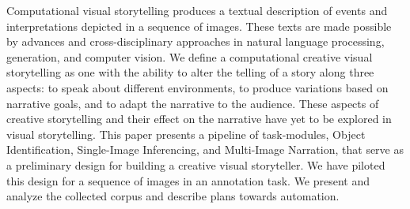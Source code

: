 Computational visual storytelling produces a textual description of events and interpretations depicted in a sequence of images. These texts are made possible by advances and cross-disciplinary approaches in natural language processing, generation, and computer vision. We define a computational creative visual storytelling as one with the ability to alter the telling of a story along three aspects: to speak about different environments, to produce variations based on narrative goals, and to adapt the narrative to the audience. These aspects of creative storytelling and their effect on the narrative have yet to be explored in visual storytelling. This paper presents a pipeline of task-modules, Object Identification, Single-Image Inferencing, and Multi-Image Narration, that serve as a preliminary design for building a creative visual storyteller. We have piloted this design for a sequence of images in an annotation task. We present and analyze the collected corpus and describe plans towards automation.
